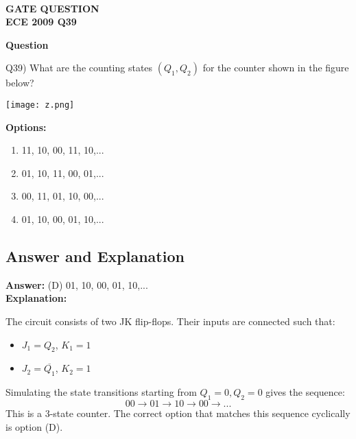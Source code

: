 \documentclass[12pt]{article}
\begin{document}
\pagestyle{empty} %

\thispagestyle{fancy} %
\fancyhf{} %
\renewcommand{\headrulewidth}{0pt} %

\vspace{10cm}
\begin{center}
   
    {\LARGE \textbf{\textcolor{darkskyblue}{\\  GATE QUESTION \\ ECE 2009 Q39}}}
\end{center}

{\color{violet}\textbf{Question}}

Q39) What are the counting states $(Q_1, Q_2)$ for the counter shown in the figure below?

\vspace{1em}
\texttt{[image: z.png]}  %

\vspace{1em}
{\color{violet}\textbf{Options:}}
\begin{enumerate}[label=(\Alph*)]
    \item 11, 10, 00, 11, 10,...
    \item 01, 10, 11, 00, 01,...
    \item 00, 11, 01, 10, 00,...
    \item 01, 10, 00, 01, 10,...
\end{enumerate}

\vspace{1em}
{\color{violet}\subsection*{Answer and Explanation}}
\textbf{Answer:} (D) 01, 10, 00, 01, 10,...\\

\textbf{Explanation:}

The circuit consists of two JK flip-flops. Their inputs are connected such that:
\begin{itemize}
    \item $J_1 = Q_2$, $K_1 = 1$
    \item $J_2 = \overline{Q_1}$, $K_2 = 1$
\end{itemize}

Simulating the state transitions starting from $Q_1 = 0, Q_2 = 0$ gives the sequence:
\[
00 \rightarrow 01 \rightarrow 10 \rightarrow 00 \rightarrow ...
\]
This is a 3-state counter. The correct option that matches this sequence cyclically is option (D).
\end{document}
